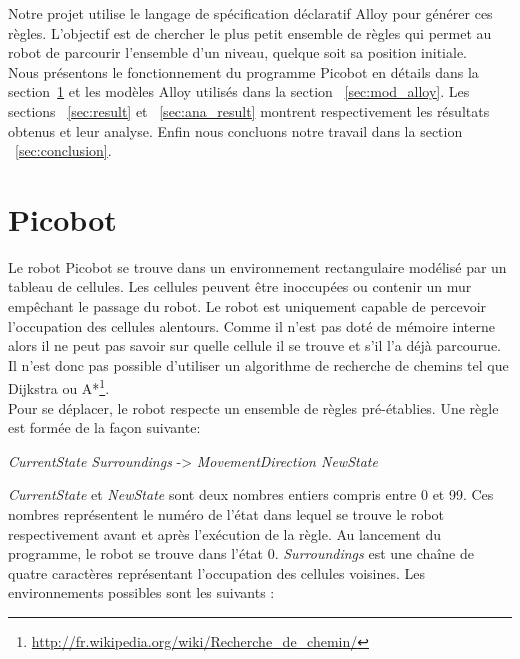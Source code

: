 \documentclass{article}
\begin{document}
Notre projet utilise le langage de spécification déclaratif Alloy pour générer ces règles. L'objectif est de chercher le plus petit ensemble de règles qui permet au robot de parcourir l’ensemble d’un niveau, quelque soit sa position initiale.
\\

Nous présentons le fonctionnement du programme Picobot en détails dans la section~\ref{sec:picobot} et les modèles Alloy utilisés dans la section ~\ref{sec:mod_alloy}. Les sections ~\ref{sec:result} et ~\ref{sec:ana_result} montrent respectivement les résultats obtenus et leur analyse. Enfin nous concluons notre travail dans la section ~\ref{sec:conclusion}.


\section{Picobot}
\label{sec:picobot}
Le robot Picobot se trouve dans un environnement rectangulaire modélisé par un tableau de cellules. Les cellules peuvent être inoccupées ou contenir un mur empêchant le passage du robot. Le robot est uniquement capable de percevoir l’occupation des cellules alentours. Comme il n’est pas doté de mémoire interne alors il ne peut pas savoir sur quelle cellule il se trouve et s’il l’a déjà parcourue. Il n’est donc pas possible d’utiliser un algorithme de recherche de chemins tel que Dijkstra ou A*\footnote{\label{pathginding_lien}\url{http://fr.wikipedia.org/wiki/Recherche\_de\_chemin/}}.
\\

Pour se déplacer, le robot respecte un ensemble de règles pré-établies. Une règle est formée de la façon suivante:
\begin{center}
\textit{CurrentState Surroundings} -> \textit{MovementDirection NewState}
\end{center}

\textit{CurrentState} et \textit{NewState} sont deux nombres entiers compris entre 0 et 99. Ces nombres représentent le numéro de l’état dans lequel se trouve le robot respectivement avant et après l’exécution de la règle. Au lancement du programme, le robot se trouve dans l’état 0.
\newpage
\textit{Surroundings} est une chaîne de quatre caractères représentant l’occupation des cellules voisines. Les environnements possibles sont les suivants : 
\end{document}
